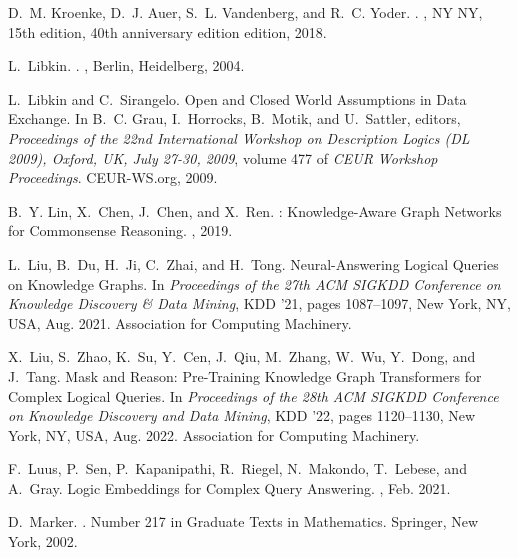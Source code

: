 \documentclass[11pt]{article}
\begin{document}
\begin{thebibliography}{10}
\begin{small}
D.~M. Kroenke, D.~J. Auer, S.~L. Vandenberg, and R.~C. Yoder.
.
, {NY NY}, 15th edition, 40th anniversary edition edition,
  2018.

L.~Libkin.
.
, {Berlin, Heidelberg}, 2004.

L.~Libkin and C.~Sirangelo.
\newblock Open and {{Closed World Assumptions}} in {{Data Exchange}}.
\newblock In B.~C. Grau, I.~Horrocks, B.~Motik, and U.~Sattler, editors, {\em
  Proceedings of the 22nd {{International Workshop}} on {{Description Logics}}
  ({{DL}} 2009), {{Oxford}}, {{UK}}, {{July}} 27-30, 2009}, volume 477 of {\em
  {{CEUR Workshop Proceedings}}}. {CEUR-WS.org}, 2009.

B.~Y. Lin, X.~Chen, J.~Chen, and X.~Ren.
: {{Knowledge-Aware Graph Networks}} for {{Commonsense
  Reasoning}}.
, 2019.

L.~Liu, B.~Du, H.~Ji, C.~Zhai, and H.~Tong.
\newblock Neural-{{Answering Logical Queries}} on {{Knowledge Graphs}}.
\newblock In {\em Proceedings of the 27th {{ACM SIGKDD Conference}} on
  {{Knowledge Discovery}} \& {{Data Mining}}}, {{KDD}} '21, pages 1087--1097,
  {New York, NY, USA}, Aug. 2021. {Association for Computing Machinery}.

X.~Liu, S.~Zhao, K.~Su, Y.~Cen, J.~Qiu, M.~Zhang, W.~Wu, Y.~Dong, and J.~Tang.
\newblock Mask and {{Reason}}: {{Pre-Training Knowledge Graph Transformers}}
  for {{Complex Logical Queries}}.
\newblock In {\em Proceedings of the 28th {{ACM SIGKDD Conference}} on
  {{Knowledge Discovery}} and {{Data Mining}}}, {{KDD}} '22, pages 1120--1130,
  {New York, NY, USA}, Aug. 2022. {Association for Computing Machinery}.

F.~Luus, P.~Sen, P.~Kapanipathi, R.~Riegel, N.~Makondo, T.~Lebese, and A.~Gray.
\newblock Logic {{Embeddings}} for {{Complex Query Answering}}.
, Feb. 2021.

D.~Marker.
.
\newblock Number 217 in Graduate Texts in Mathematics. {Springer}, {New York},
  2002.


\end{small}
\end{thebibliography}
\end{document}

